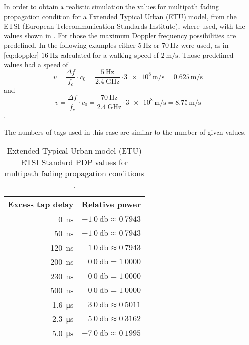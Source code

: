 In order to obtain a realistic simulation the values for multipath fading propagation condition for a Extended Typical Urban (ETU) model, from the ETSI (European Telecommunication Standards Institute), where used\cite{ETSI}, with the values shown in . For those the maximum Doppler frequency possibilities are predefined. In the following examples  either \(\SI{5}{\hertz}\) or \(\SI{70}{\hertz}\) were used, as in \eqref{eq:doppler} \(\SI{16}{\hertz}\) calculated for a walking speed of \(\SI{2}{\meter\per\second}\). Those predefined values had a speed of
\begin{equation}
	v = \frac{\Delta f}{f_c}\cdot c_0 = \frac{\SI{5}{\hertz}}{\SI{2.4}{\giga\hertz}}\cdot \SI{3e8}{\meter\per\second}= \SI{0.625}{\meter\per\second}
\end{equation}
and
\begin{equation}
	v = \frac{\Delta f}{f_c}\cdot c_0 = \frac{\SI{70}{\hertz}}{\SI{2.4}{\giga\hertz}}\cdot \SI{3e8}{\meter\per\second}= \SI{8.75}{\meter\per\second}
\end{equation}.

The numbers of tags used in this case are similar to the number of given values.

\begin{table}[b]
	\centering
	\begin{tabular}{rr}
		\toprule
		\bfseries Excess tap delay & \bfseries Relative power \\
		\midrule
		\SI{   0}{\nano\second} & \(\SI{-1.0}{\decibel} \approx 0.7943\) \\
		\SI{  50}{\nano\second} & \(\SI{-1.0}{\decibel} \approx 0.7943\) \\
		\SI{ 120}{\nano\second} & \(\SI{-1.0}{\decibel} \approx 0.7943\) \\
		\SI{ 200}{\nano\second} & \(\SI{ 0.0}{\decibel} = 1.0000\) \\
		\SI{ 230}{\nano\second} & \(\SI{ 0.0}{\decibel} = 1.0000\) \\
		\SI{ 500}{\nano\second} & \(\SI{ 0.0}{\decibel} = 1.0000\) \\
		\SI{1.6}{\micro\second} & \(\SI{-3.0}{\decibel} \approx 0.5011\) \\
		\SI{2.3}{\micro\second} & \(\SI{-5.0}{\decibel} \approx 0.3162\) \\
		\SI{5.0}{\micro\second} & \(\SI{-7.0}{\decibel} \approx 0.1995\) \\
		\bottomrule
	\end{tabular}
	\caption{Extended Typical Urban model (ETU) ETSI Standard PDP values for multipath fading propagation conditions \cite{ETSI}. \label{tab:etsi-tap-values}}
\end{table}

